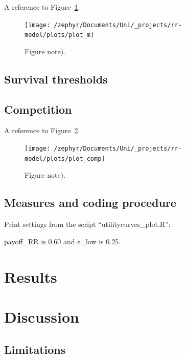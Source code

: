 \documentclass[british,,man,floatsintext]{apa6}
\begin{document}
A reference to Figure~\ref{fig:mplot}.



\begin{figure}
\texttt{[image: /zephyr/Documents/Uni/\_projects/rr-model/plots/plot\_m]} \caption{Figure note).}\label{fig:mplot}
\end{figure}

\hypertarget{survival-thresholds}{%
\subsection{Survival thresholds}\label{survival-thresholds}}

\hypertarget{competition}{%
\subsection{Competition}\label{competition}}

A reference to Figure~\ref{fig:competitionplot}.



\begin{figure}
\texttt{[image: /zephyr/Documents/Uni/\_projects/rr-model/plots/plot\_comp]} \caption{Figure note).}\label{fig:competitionplot}
\end{figure}

\hypertarget{measures-and-coding-procedure}{%
\subsection{Measures and coding procedure}\label{measures-and-coding-procedure}}

Print settings from the script \enquote{utilitycurves\_plot.R}:

payoff\_RR is \(0.60\) and e\_low is 0.25.

\hypertarget{results-1}{%
\section{Results}\label{results-1}}

\hypertarget{discussion}{%
\section{Discussion}\label{discussion}}

\hypertarget{limitations}{%
\subsection{Limitations}\label{limitations}}
\end{document}
